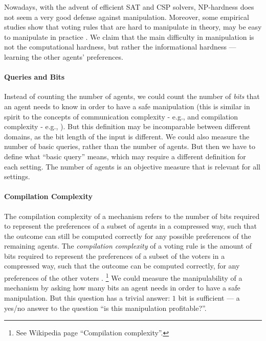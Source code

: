 Nowadays, with the advent of efficient SAT and CSP solvers, NP-hardness does not seem a very good defense against manipulation. Moreover, some empirical studies show that voting rules that are hard to manipulate in theory, may be easy to manipulate in practice  \citep{walsh2011hard}.
We claim that the main difficulty in manipulation is not the computational hardness, but rather the informational hardness --- learning the other agents' preferences. 


\paragraph{Queries and Bits}
Instead of counting the number of agents, we could count the number of \emph{bits} that an agent needs to know in order to have a safe manipulation
(this is similar in spirit to the concepts of communication complexity - e.g., \cite{nisan2002communication, grigorieva2006communication, Communication2019Branzei,Babichenko2019communication} and compilation complexity - e.g., \citep{chevaleyre2009compiling,xia2010compilation,karia2021compilation}).
But this definition may be incomparable between different domains, as the bit length of the input is different.
We could also measure the number of basic queries, rather than the number of agents. But then we have to define what ``basic query'' means, which may require a different definition for each setting. The number of agents is an objective measure that is relevant for all settings.

\iffalse
\paragraph{Compilation Complexity}
The compilation complexity of a mechanism refers to the number of bits required to represent the preferences of a subset of agents in a compressed way, such that the outcome can still be computed correctly for any possible preferences of the remaining agents.
The \emph{compilation complexity} of a voting rule is the amount of bits required to represent the preferences of a subset of the voters in a compressed way, such  that the outcome can be computed correctly, for any preferences of the other voters
\citep{chevaleyre2009compiling,xia2010compilation,karia2021compilation}.%
\footnote{
See Wikipedia page ``Compilation complexity''.
}
We could measure the manipulability of a mechanism by asking how many bits an agent needs in order to have a safe manipulation. But this question has a trivial answer: $1$ bit is sufficient --- a yes/no answer to the question ``is this manipulation profitable?''. 



